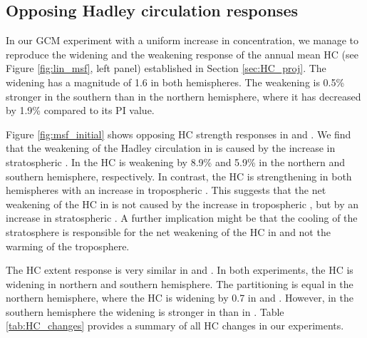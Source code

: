 \subsection{Opposing Hadley circulation responses}


In our GCM experiment with a uniform increase in \CO concentration, we manage to reproduce the widening and the weakening response of the annual mean HC (see Figure \ref{fig:lin_msf}, left panel) established in Section \ref{sec:HC_proj}. The widening has a magnitude of \SI{1.6}{\deg} in both hemispheres. The weakening is 0.5\% stronger in the southern than in the northern hemisphere, where it has decreased by 1.9\% compared to its PI value.

Figure \ref{fig:msf_initial} shows opposing HC strength responses in \tropo and \strato. We find that the weakening of the Hadley circulation in \uniform is caused by the increase in stratospheric \CO. In \strato the HC is weakening by 8.9\% and 5.9\% in the northern and southern hemisphere, respectively. In contrast, the HC is strengthening in both hemispheres with an increase in tropospheric \CO. This suggests that the net weakening of the HC in \uniform is not caused by the increase in tropospheric \CO, but by an increase in stratospheric \CO. A further implication might be that the cooling of the stratosphere is responsible for the net weakening of the HC in \uniform and not the warming of the troposphere.

The HC extent response is very similar in \tropo and \strato. In both experiments, the HC is widening in northern and southern hemisphere. The partitioning is equal in the northern hemisphere, where the HC is widening by \SI{0.7}{\deg} in \tropo and \strato. However, in the southern hemisphere the widening is stronger in \tropo than in \strato. Table \ref{tab:HC_changes} provides a summary of all HC changes in our experiments.



